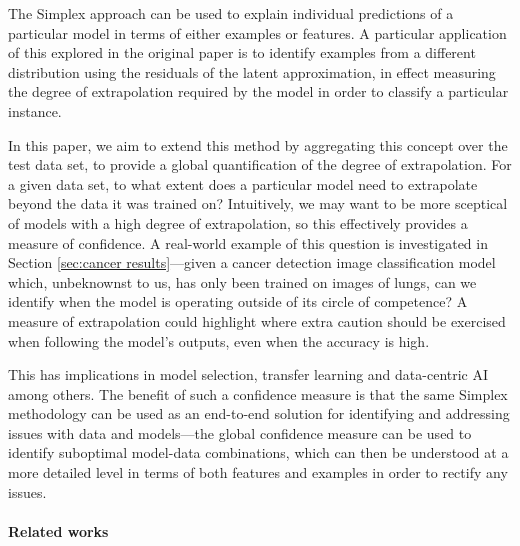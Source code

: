 \documentclass{article}
\begin{document}
The Simplex approach \cite{crabbe_explaining_2021} can be used to explain individual predictions of a particular model in terms of either examples or features. A particular application of this explored in the original paper is to identify examples from a different distribution using the residuals of the latent approximation, in effect measuring the degree of extrapolation required by the model in order to classify a particular instance.

In this paper, we aim to extend this method by aggregating this concept over the test data set, to provide a global quantification of the degree of extrapolation. For a given data set, to what extent does a particular model need to extrapolate beyond the data it was trained on? Intuitively, we may want to be more sceptical of models with a high degree of extrapolation, so this effectively provides a measure of confidence.
A real-world example of this question is investigated in Section \ref{sec:cancer results}---given a cancer detection image classification model which, unbeknownst to us, has only been trained on images of lungs, can we identify when the model is operating outside of its circle of competence? A measure of extrapolation could highlight where extra caution should be exercised when following the model's outputs, even when the accuracy is high.

This has implications in model selection, transfer learning and data-centric AI among others. The benefit of such a confidence measure is that the same Simplex methodology can be used as an end-to-end solution for identifying and addressing issues with data and models---the global confidence measure can be used to identify suboptimal model-data combinations, which can then be understood at a more detailed level in terms of both features and examples in order to rectify any issues.


\paragraph{Related works}
\end{document}
